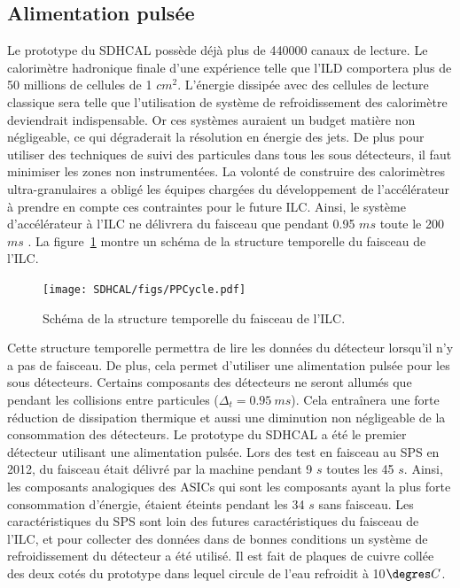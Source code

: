 \subsection{Alimentation pulsée}
Le prototype du SDHCAL possède déjà plus de 440000 canaux de lecture. Le calorimètre hadronique finale d'une expérience telle que l'ILD comportera plus de 50 millions de cellules de 1 $cm^2$. L'énergie dissipée avec des cellules de lecture classique sera telle que l'utilisation de système de refroidissement des calorimètre deviendrait indispensable. Or ces systèmes auraient un budget matière non négligeable, ce qui dégraderait la résolution en énergie des jets. De plus pour utiliser des techniques de suivi des particules dans tous les sous détecteurs, il faut minimiser les zones non instrumentées. La volonté de construire des calorimètres ultra-granulaires a obligé les équipes chargées du développement de l'accélérateur à prendre en compte ces contraintes pour le future ILC. Ainsi, le système d'accélérateur à l'ILC ne délivrera du faisceau que pendant 0.95 $ms$ toute le 200 $ms$ \cite{acceleratorTDR}. La figure~\ref{fig:ILCCycle} montre un schéma de la structure temporelle du faisceau de l'ILC.
\begin{figure}[!h]
  \begin{center}
    \texttt{[image: SDHCAL/figs/PPCycle.pdf]}
    \caption{Schéma de la structure temporelle du faisceau de l'ILC.}
    \label{fig:ILCCycle}
  \end{center}
\end{figure}
Cette structure temporelle permettra de lire les données du détecteur lorsqu'il n'y a pas de faisceau. De plus, cela permet d'utiliser une alimentation pulsée pour les sous détecteurs. Certains composants des détecteurs ne seront allumés que pendant les collisions entre particules ($\Delta_t=0.95~ms$). Cela entraînera une forte réduction de dissipation thermique et aussi une diminution non négligeable de la consommation des détecteurs. Le prototype du SDHCAL a été le premier détecteur utilisant une alimentation pulsée. Lors des test en faisceau au SPS en 2012, du faisceau était délivré par la machine pendant 9 $s$ toutes les 45 $s$. Ainsi, les composants analogiques des ASICs qui sont les composants ayant la plus forte consommation d'énergie, étaient éteints pendant les 34 $s$ sans faisceau. Les caractéristiques du SPS sont loin des futures caractéristiques du faisceau de l'ILC, et pour collecter des données dans de bonnes conditions un système de refroidissement du détecteur a été utilisé. Il est fait de plaques de cuivre collée des deux cotés du prototype dans lequel circule de l'eau refroidit à 10$\degres C$.

